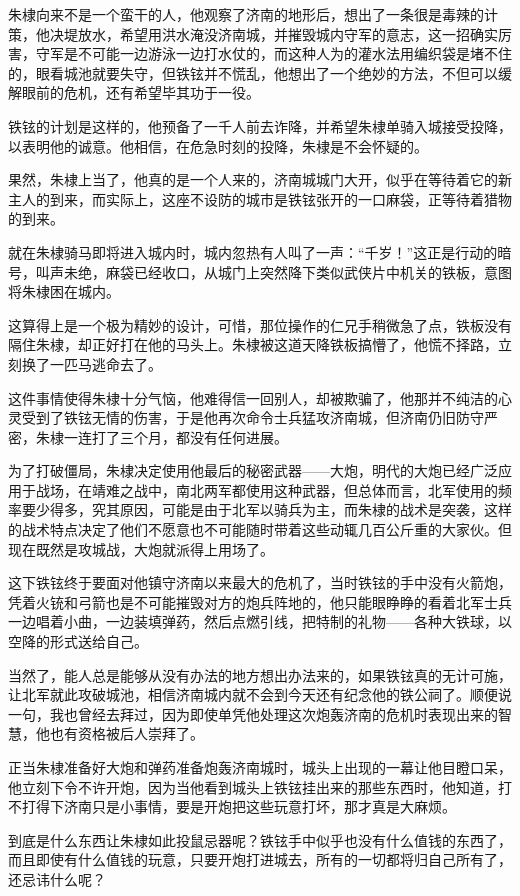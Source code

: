 \begin{multicols}{\theparacolNo}
		朱棣向来不是一个蛮干的人，他观察了济南的地形后，想出了一条很是毒辣的计策，他决堤放水，希望用洪水淹没济南城，并摧毁城内守军的意志，这一招确实厉害，守军是不可能一边游泳一边打水仗的，而这种人为的灌水法用编织袋是堵不住的，眼看城池就要失守，但铁铉并不慌乱，他想出了一个绝妙的方法，不但可以缓解眼前的危机，还有希望毕其功于一役。

		铁铉的计划是这样的，他预备了一千人前去诈降，并希望朱棣单骑入城接受投降，以表明他的诚意。他相信，在危急时刻的投降，朱棣是不会怀疑的。

		果然，朱棣上当了，他真的是一个人来的，济南城城门大开，似乎在等待着它的新主人的到来，而实际上，这座不设防的城市是铁铉张开的一口麻袋，正等待着猎物的到来。

		就在朱棣骑马即将进入城内时，城内忽热有人叫了一声：“千岁！”这正是行动的暗号，叫声未绝，麻袋已经收口，从城门上突然降下类似武侠片中机关的铁板，意图将朱棣困在城内。

		这算得上是一个极为精妙的设计，可惜，那位操作的仁兄手稍微急了点，铁板没有隔住朱棣，却正好打在他的马头上。朱棣被这道天降铁板搞懵了，他慌不择路，立刻换了一匹马逃命去了。

		这件事情使得朱棣十分气恼，他难得信一回别人，却被欺骗了，他那并不纯洁的心灵受到了铁铉无情的伤害，于是他再次命令士兵猛攻济南城，但济南仍旧防守严密，朱棣一连打了三个月，都没有任何进展。

		为了打破僵局，朱棣决定使用他最后的秘密武器——大炮，明代的大炮已经广泛应用于战场，在靖难之战中，南北两军都使用这种武器，但总体而言，北军使用的频率要少得多，究其原因，可能是由于北军以骑兵为主，而朱棣的战术是突袭，这样的战术特点决定了他们不愿意也不可能随时带着这些动辄几百公斤重的大家伙。但现在既然是攻城战，大炮就派得上用场了。

		这下铁铉终于要面对他镇守济南以来最大的危机了，当时铁铉的手中没有火箭炮，凭着火铳和弓箭也是不可能摧毁对方的炮兵阵地的，他只能眼睁睁的看着北军士兵一边唱着小曲，一边装填弹药，然后点燃引线，把特制的礼物——各种大铁球，以空降的形式送给自己。

		当然了，能人总是能够从没有办法的地方想出办法来的，如果铁铉真的无计可施，让北军就此攻破城池，相信济南城内就不会到今天还有纪念他的铁公祠了。顺便说一句，我也曾经去拜过，因为即使单凭他处理这次炮轰济南的危机时表现出来的智慧，他也有资格被后人崇拜了。

		正当朱棣准备好大炮和弹药准备炮轰济南城时，城头上出现的一幕让他目瞪口呆，他立刻下令不许开炮，因为当他看到城头上铁铉挂出来的那些东西时，他知道，打不打得下济南只是小事情，要是开炮把这些玩意打坏，那才真是大麻烦。

		到底是什么东西让朱棣如此投鼠忌器呢？铁铉手中似乎也没有什么值钱的东西了，而且即使有什么值钱的玩意，只要开炮打进城去，所有的一切都将归自己所有了，还忌讳什么呢？


\end{multicols}
